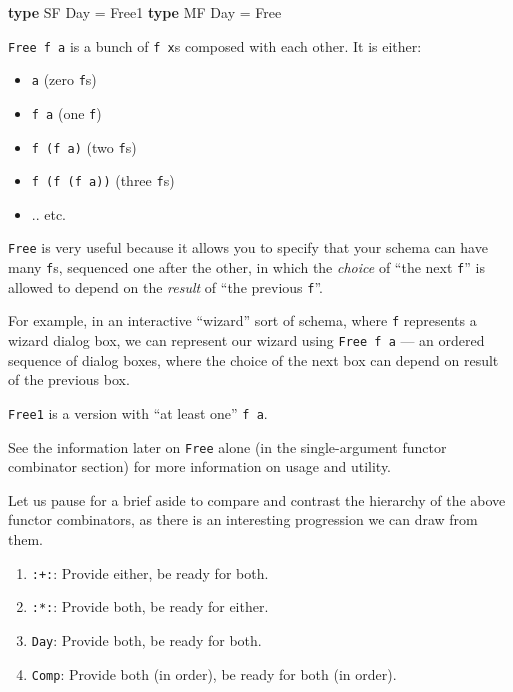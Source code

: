 \documentclass[]{article}
\newenvironment{Shaded}{}{}
\newcommand{\DataTypeTok}[1]{\textcolor[rgb]{0.56,0.13,0.00}{#1}}
\newcommand{\KeywordTok}[1]{\textcolor[rgb]{0.00,0.44,0.13}{\textbf{#1}}}
\newcommand{\OtherTok}[1]{\textcolor[rgb]{0.00,0.44,0.13}{#1}}
\begin{document}
\begin{itemize}
\begin{Shaded}
\begin{Highlighting}[]
\KeywordTok{type} \DataTypeTok{SF} \DataTypeTok{Day} \OtherTok{=} \DataTypeTok{Free1}
\KeywordTok{type} \DataTypeTok{MF} \DataTypeTok{Day} \OtherTok{=} \DataTypeTok{Free}
\end{Highlighting}
\end{Shaded}

  \texttt{Free\ f\ a} is a bunch of \texttt{f\ x}s composed with each other. It
  is either:

  \begin{itemize}
  \tightlist
  \item
    \texttt{a} (zero \texttt{f}s)
  \item
    \texttt{f\ a} (one \texttt{f})
  \item
    \texttt{f\ (f\ a)} (two \texttt{f}s)
  \item
    \texttt{f\ (f\ (f\ a))} (three \texttt{f}s)
  \item
    .. etc.
  \end{itemize}

  \texttt{Free} is very useful because it allows you to specify that your schema
  can have many \texttt{f}s, sequenced one after the other, in which the
  \emph{choice} of ``the next \texttt{f}'' is allowed to depend on the
  \emph{result} of ``the previous \texttt{f}''.

  For example, in an interactive ``wizard'' sort of schema, where \texttt{f}
  represents a wizard dialog box, we can represent our wizard using
  \texttt{Free\ f\ a} --- an ordered sequence of dialog boxes, where the choice
  of the next box can depend on result of the previous box.

  \texttt{Free1} is a version with ``at least one'' \texttt{f\ a}.

  See the information later on \texttt{Free} alone (in the single-argument
  functor combinator section) for more information on usage and utility.
\end{itemize}

Let us pause for a brief aside to compare and contrast the hierarchy of the
above functor combinators, as there is an interesting progression we can draw
from them.

\begin{enumerate}
\def\labelenumi{\arabic{enumi}.}
\tightlist
\item
  \texttt{:+:}: Provide either, be ready for both.
\item
  \texttt{:*:}: Provide both, be ready for either.
\item
  \texttt{Day}: Provide both, be ready for both.
\item
  \texttt{Comp}: Provide both (in order), be ready for both (in order).
\end{enumerate}
\end{document}
